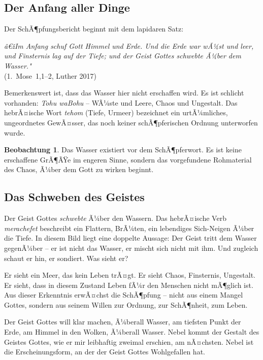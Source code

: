 ﻿\documentclass[a4paper,12pt]{article}
\theoremstyle{definition}
\newtheorem{observation}{Beobachtung}[section]
\begin{document}
\subsection{Der Anfang aller Dinge}

Der SchÃ¶pfungsbericht beginnt mit dem lapidaren Satz:

\begin{displayquote}
    \textit{â€žIm Anfang schuf Gott Himmel und Erde. Und die Erde war wÃ¼st und leer,
    und Finsternis lag auf der Tiefe; und der Geist Gottes schwebte Ã¼ber dem
    Wasser."}\\
    \hfill (1.~Mose~1,1--2, Luther 2017)
\end{displayquote}

Bemerkenswert ist, dass das Wasser hier nicht erschaffen wird. Es ist schlicht
vorhanden: \textit{Tohu waBohu} -- WÃ¼ste und Leere, Chaos und Ungestalt. Das
hebrÃ¤ische Wort \textit{tehom} (Tiefe, Urmeer) bezeichnet ein urtÃ¼mliches,
ungeordnetes GewÃ¤sser, das noch keiner schÃ¶pferischen Ordnung unterworfen wurde.

\begin{observation}
    Das Wasser existiert vor dem SchÃ¶pferwort. Es ist keine erschaffene GrÃ¶ÃŸe im
    engeren Sinne, sondern das vorgefundene Rohmaterial des Chaos, Ã¼ber dem Gott
    zu wirken beginnt.
\end{observation}

\subsection{Das Schweben des Geistes}

Der Geist Gottes \textit{schwebte} Ã¼ber den Wassern. Das hebrÃ¤ische Verb
\textit{merachefet} beschreibt ein Flattern, BrÃ¼ten, ein lebendiges Sich-Neigen
Ã¼ber die Tiefe. In diesem Bild liegt eine doppelte Aussage: Der Geist tritt dem
Wasser gegenÃ¼ber -- er ist nicht das Wasser, er mischt sich nicht mit ihm. Und
zugleich schaut er hin, er sondiert. Was sieht er?

Er sieht ein Meer, das kein Leben trÃ¤gt. Er sieht Chaos, Finsternis, Ungestalt.
Er sieht, dass in diesem Zustand Leben fÃ¼r den Menschen nicht mÃ¶glich ist.
Aus dieser Erkenntnis erwÃ¤chst die SchÃ¶pfung -- nicht aus einem Mangel Gottes,
sondern aus seinem Willen zur Ordnung, zur SchÃ¶nheit, zum Leben.

Der Geist Gottes will klar machen, Ã¼berall Wasser, am tiefsten Punkt der Erde, am Himmel in den Wolken, Ã¼berall Wasser. Nebel kommt der Gestalt des Geistes Gottes, wie er mir leibhaftig zweimal erschien, am nÃ¤chsten. Nebel ist die Erscheinungsform, an der der Geist Gottes Wohlgefallen hat.
\end{document}
